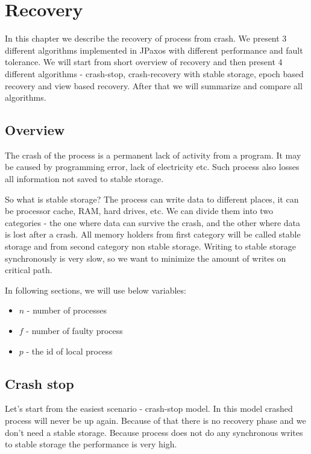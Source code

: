 \chapter{Recovery}

In this chapter we describe the recovery of process from crash. We present 3 different algorithms implemented in JPaxos with different performance and fault tolerance. We will start from short overview of recovery and then present 4 different algorithms - crash-stop, crash-recovery with stable storage, epoch based recovery and view based recovery. After that we will summarize and compare all algorithms.

\section{Overview}

The crash of the process is a permanent lack of activity from a program. It may be caused by programming error, lack of electricity etc. Such process also losses all information not saved to stable storage.

So what is stable storage? The process can write data to different places, it can be processor cache, RAM, hard drives, etc. We can divide them into two categories - the one where data can survive the crash, and the other where data is lost after a crash. All memory holders from first category will be called stable storage and from second category non stable storage. Writing to stable storage synchronously is very slow, so we want to minimize the amount of writes on critical path.

In following sections, we will use below variables: 
\begin{itemize}
  \item $n$ - number of processes
  \item $f$ - number of faulty process
  \item $p$ - the id of local process
\end{itemize}

\section{Crash stop}
\label{sec:crash_stop}

Let's start from the easiest scenario - crash-stop model. In this model crashed process will never be up again.
Because of that there is no recovery phase and we don't need a stable storage. Because process does not do any synchronous writes to stable storage the performance is very high. 

